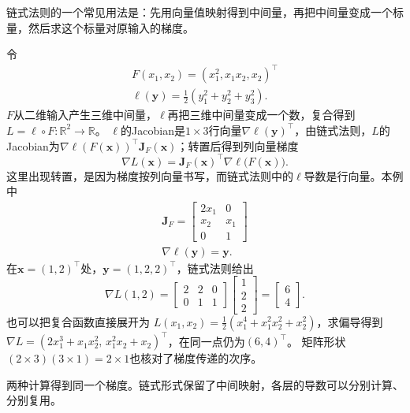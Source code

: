 链式法则的一个常见用法是：先用向量值映射得到中间量，再把中间量变成一个标量，然后求这个标量对原输入的梯度。
\begin{example}[从中间向量求回复合目标的梯度]
\label{ex:analysis-chain-rule-calculation}
令
\[
 \begin{gathered}
F(x_1,x_2)=(x_1^2,x_1x_2,x_2)^\top\\
\ell(\bm y)=\frac12(y_1^2+y_2^2+y_3^2).
 \end{gathered}
\]
$F$从二维输入产生三维中间量，$\ell$再把三维中间量变成一个数，复合得到$L=\ell\circ F:\mathbb R^2\to\mathbb R$。
$\ell$的Jacobian是$1\times3$行向量$\nabla\ell(\bm y)^\top$，由链式法则，$L$的Jacobian为$\nabla\ell(F(\bm x))^\top\bm J_F(\bm x)$；转置后得到列向量梯度
\[
  \nabla L(\bm x)=\bm J_F(\bm x)^\top\nabla\ell\bigl(F(\bm x)\bigr).
\]
这里出现转置，是因为梯度按列向量书写，而链式法则中的$\ell$导数是行向量。本例中
\[
\begin{gathered}
\bm J_F=\begin{bmatrix}2x_1&0\\x_2&x_1\\0&1\end{bmatrix}\\
\nabla\ell(\bm y)=\bm y.
\end{gathered}
\]
在$\bm x=(1,2)^\top$处，$\bm y=(1,2,2)^\top$，链式法则给出
\[
  \nabla L(1,2)
  =\begin{bmatrix}2&2&0\\0&1&1\end{bmatrix}
    \begin{bmatrix}1\\2\\2\end{bmatrix}
  =\begin{bmatrix}6\\4\end{bmatrix}.
\]
也可以把复合函数直接展开为
$L(x_1,x_2)=\tfrac12(x_1^4+x_1^2x_2^2+x_2^2)$，求偏导得到
$\nabla L=(2x_1^3+x_1x_2^2,\,x_1^2x_2+x_2)^\top$，在同一点仍为$(6,4)^\top$。
矩阵形状$(2\times3)(3\times1)=2\times1$也核对了梯度传递的次序。
\end{example}

两种计算得到同一个梯度。链式形式保留了中间映射，各层的导数可以分别计算、分别复用。

